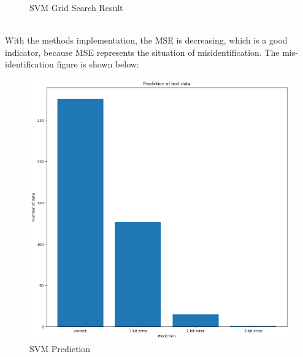 \documentclass[conference]{IEEEtran}
\begin{document}
{\begin{figure}[h]
\begin{center}
	\caption{SVM Grid Search Result}
	\end{center}
	\end{figure}\\
With the methods implementation, the MSE is decreasing, which is a good indicator, because MSE represents the situation of misidentification.
The mis-identification figure is shown below:
	\begin{figure}[h]
	\label{fig:foo}
	\begin{center}
	\includegraphics[scale=0.4]{SVMPrediction.png}
	\caption{SVM Prediction}
	\end{center}
	\end{figure}\\

\pagebreak\\

}
\end{document}

